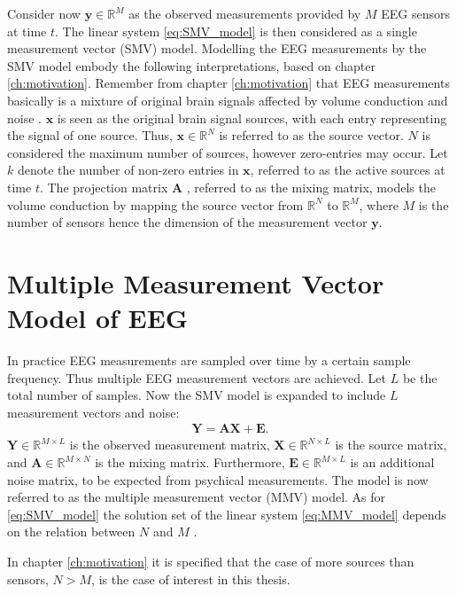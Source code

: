 Consider now $\mathbf{y} \in \mathbb{R}^M$ as the observed measurements provided by $M$ EEG sensors at time $t$. 
The linear system \ref{eq:SMV_model} is then considered as a single measurement vector (SMV) model.  
Modelling the EEG measurements by the SMV model embody the following interpretations, based on chapter \ref{ch:motivation}.
Remember from chapter \ref{ch:motivation} that EEG measurements basically is a mixture of original brain signals affected by volume conduction and noise .
$\textbf{x}$ is seen as the original brain signal sources, with each entry representing the signal of one source. 
Thus, $\textbf{x}\in \mathbb{R}^N$ is referred to as the source vector. $N$ is considered the maximum number of sources, however zero-entries may occur. Let $k$ denote the number of non-zero entries in $\textbf{x}$, referred to as the active sources at time $t$.   
The projection matrix $\textbf{A}$ , referred to as the mixing matrix, models the volume conduction by mapping the source vector from $\mathbb{R}^N$ to $\mathbb{R}^M$, where $M$ is the number of sensors hence the dimension of the measurement vector $\textbf{y}$.             

\section{Multiple Measurement Vector Model of EEG}\label{sec:MMV}
In practice EEG measurements are sampled over time by a certain sample frequency. 
Thus multiple EEG measurement vectors are achieved.
Let $L$ be the total number of samples. Now the SMV model is expanded to include $L$ measurement vectors and noise:
\begin{align}\label{eq:MMV_model}
\mathbf{Y} = \mathbf{AX}+\textbf{E}.
\end{align}
$\mathbf{Y} \in \mathbb{R}^{M \times L}$ is the observed measurement matrix, $\mathbf{X} \in \mathbb{R}^{N \times L}$ is the source matrix, and $\mathbf{A} \in \mathbb{R}^{M \times N}$ is the mixing matrix. 
Furthermore, $\textbf{E} \in \mathbb{R}^{M \times L}$ is an additional noise matrix, to be expected from psychical measurements.  
The model is now referred to as the multiple measurement vector (MMV) model.
As for \eqref{eq:SMV_model} the solution set of the linear system \eqref{eq:MMV_model} depends on the relation between $N$ and $M$ \cite[p. 42]{CS}. 

In chapter \ref{ch:motivation} it is specified that the case of more sources than sensors, $N>M$, is the case of interest in this thesis.  

